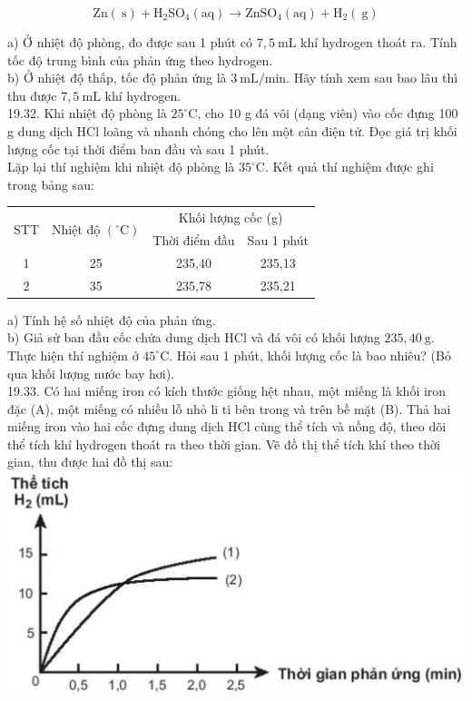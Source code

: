 \documentclass[10pt]{article}
\begin{document}
$$
\mathrm{Zn}(\mathrm{~s})+\mathrm{H}_{2} \mathrm{SO}_{4}(\mathrm{aq}) \rightarrow \mathrm{ZnSO}_{4}(\mathrm{aq})+\mathrm{H}_{2}(\mathrm{~g})
$$

a) Ở nhiệt độ phòng, đo được sau 1 phút có $7,5 \mathrm{~mL}$ khí hydrogen thoát ra. Tính tốc độ trung bình của phản ứng theo hydrogen.\\
b) Ở nhiệt độ thấp, tốc độ phản ứng là $3 \mathrm{~mL} / \mathrm{min}$. Hãy tính xem sau bao lâu thì thu được $7,5 \mathrm{~mL}$ khí hydrogen.\\
19.32. Khi nhiệt độ phòng là $25^{\circ} \mathrm{C}$, cho 10 g đá vôi (dạng viên) vào cốc đựng 100 g dung dịch HCl loãng và nhanh chóng cho lên một cân điện tử. Đọc giá trị khối lượng cốc tại thời điểm ban đầu và sau 1 phút.\\
Lặp lại thí nghiệm khi nhiệt độ phòng là $35^{\circ} \mathrm{C}$. Kết quả thí nghiệm được ghi trong bảng sau:

\begin{center}
\begin{tabular}{|c|c|c|c|}
\hline
\multirow{2}{*}{STT} & \multirow{2}{*}{Nhiệt độ $\left({ }^{\circ} \mathrm{C}\right)$} & \multicolumn{2}{|c|}{Khối lượng cốc (g)} \\
\cline { 3 - 4 }
 &  & Thời điểm đầu & Sau 1 phút \\
\hline
1 & 25 & 235,40 & 235,13 \\
\hline
2 & 35 & 235,78 & 235,21 \\
\hline
\end{tabular}
\end{center}

a) Tính hệ số nhiệt độ của phản ứng.\\
b) Giả sử ban đầu cốc chứa dung dịch HCl và đá vôi có khối lượng $235,40 \mathrm{~g}$. Thực hiện thí nghiệm ở $45^{\circ} \mathrm{C}$. Hỏi sau 1 phút, khối lượng cốc là bao nhiêu? (Bỏ qua khối lượng nước bay hơi).\\
19.33. Có hai miếng iron có kích thước giống hệt nhau, một miếng là khối iron đặc (A), một miếng có nhiều lỗ nhỏ li ti bên trong và trên bề mặt (B). Thả hai miếng iron vào hai cốc đựng dung dịch HCl cùng thể tích và nồng độ, theo dõi thể tích khí hydrogen thoát ra theo thời gian. Vẽ đồ thị thể tích khí theo thời gian, thu được hai đồ thị sau:\\
\includegraphics[max width=\textwidth, center]{2025_10_23_daab5c8457c85b365b9eg-58}
\end{document}
